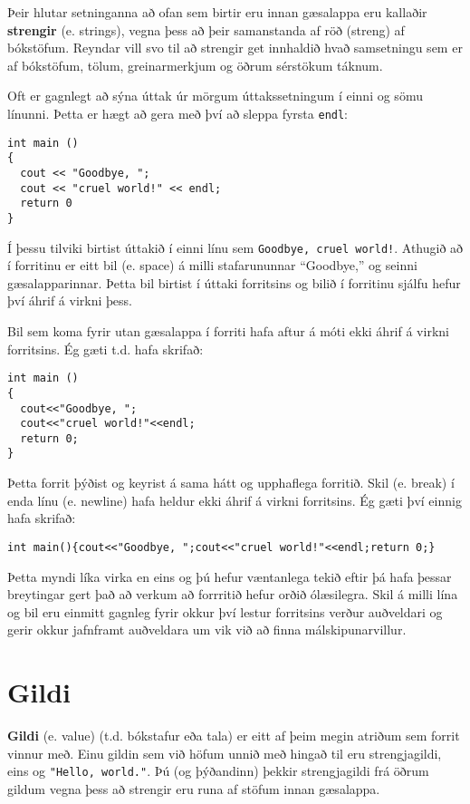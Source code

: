 
Þeir hlutar setninganna að ofan sem birtir eru innan gæsalappa eru kallaðir {\bf strengir} (e. strings),
vegna þess að þeir samanstanda af röð (streng) af bókstöfum.
Reyndar vill svo til að strengir get innhaldið hvað samsetningu sem er af bókstöfum, tölum, greinarmerkjum og öðrum sérstökum táknum.


Oft er gagnlegt að sýna úttak úr mörgum úttakssetningum í einni og sömu línunni.
Þetta er hægt að gera með því að sleppa fyrsta {\tt endl}:

\begin{verbatim}
int main ()
{
  cout << "Goodbye, ";
  cout << "cruel world!" << endl;
  return 0
}
\end{verbatim}
%
Í þessu tilviki birtist úttakið í einni línu sem {\tt Goodbye, cruel world!}.
Athugið að í forritinu er eitt bil (e. space) á milli stafarununnar ``Goodbye,'' og seinni gæsalapparinnar.
Þetta bil birtist í úttaki forritsins og bilið í forritinu sjálfu hefur því áhrif á virkni þess.

Bil sem koma fyrir utan gæsalappa í forriti hafa aftur á móti ekki áhrif á virkni forritsins.
Ég gæti t.d. hafa skrifað:

\begin{verbatim}
int main ()
{
  cout<<"Goodbye, ";
  cout<<"cruel world!"<<endl;
  return 0;
}
\end{verbatim}
%
Þetta forrit þýðist og keyrist á sama hátt og upphaflega forritið.
Skil (e. break) í enda línu (e. newline) hafa heldur ekki áhrif á virkni forritsins.
Ég gæti því einnig hafa skrifað:

\begin{verbatim}
int main(){cout<<"Goodbye, ";cout<<"cruel world!"<<endl;return 0;}
\end{verbatim}
%
Þetta myndi líka virka en eins og þú hefur væntanlega tekið eftir þá hafa þessar breytingar gert það að verkum að forrritið hefur orðið ólæsilegra.
Skil á milli lína og bil eru einmitt gagnleg fyrir okkur því lestur forritsins verður auðveldari og gerir okkur jafnframt auðveldara um vik við að finna málskipunarvillur.

\section{Gildi}

{\bf Gildi} (e. value) (t.d. bókstafur eða tala) er eitt af þeim megin atriðum sem forrit vinnur með.
Einu gildin sem við höfum unnið með hingað til eru strengjagildi, eins og {\tt "Hello, world."}.
Þú (og þýðandinn) þekkir strengjagildi frá öðrum gildum vegna þess að strengir eru runa af stöfum innan gæsalappa.

